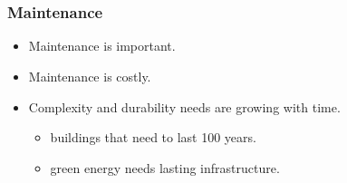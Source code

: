 \section[Context and SoA]{\introtitle}

\begin{frame}
\frametitle{\textbf{Maintenance}}

  \begin{itemize}[<+->]
    \item Maintenance is important.
    \item Maintenance is costly.
    \item Complexity and durability needs are growing with time.
    \begin{itemize}[<+->]
      \item buildings that need to last 100 years.
      \item green energy needs lasting infrastructure.
    \end{itemize}
  \end{itemize}

\end{frame}

